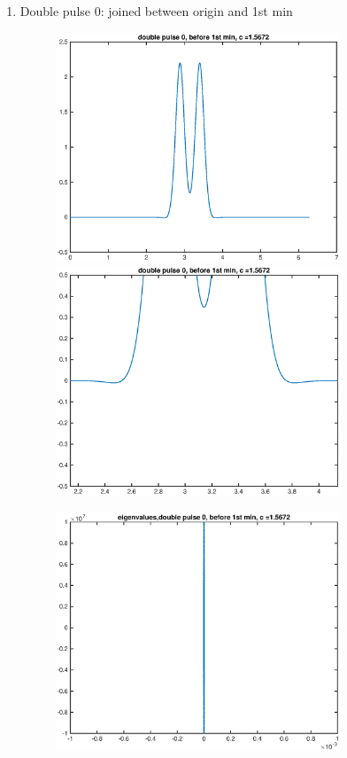 \documentclass[12pt]{article}
\begin{document}
\begin{enumerate}
	\item Double pulse 0: joined between origin and 1st min
	\begin{figure}[H]
	\includegraphics[width=8.5cm]{KdVdouble0.eps}
	\includegraphics[width=8.5cm]{KdVdouble0zoom.eps}
	\end{figure}
	\begin{figure}[H]
	\includegraphics[width=8.5cm]{KdVdouble0eig.eps}
	\end{figure}


\end{enumerate}
\end{document}
